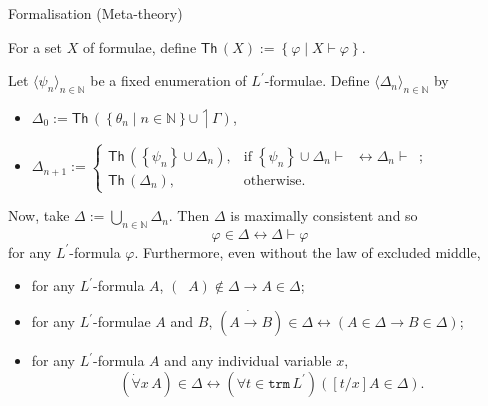 \documentclass[serif,table,10pt]{beamer}
\newcommand{\IN}{\mathbb{N}}
\newcommand{\0}{\texttt{0}}
\newcommand{\1}{\texttt{1}}
\newcommand{\embed}[1]{{\upharpoonleft} {#1}}
\newcommand{\Lbot}{\mathop{\dot{\bot}}}
\newcommand{\Lneg}{\mathop{\dot{\neg}}}
\newcommand{\Lto}{\mathrel{\dot{\to}}}
\newcommand{\Lall}[1]{\dot{\forall}#1\,}
\begin{document}
\begin{frame}{Formalisation (Meta-theory)}

    For a set $X$ of formulae, define $ \mathsf{Th} \, ( X ) := \left\{ \varphi \mid X \vdash \varphi \right\} $.

    Let $\langle\psi_n\rangle_{n \in \IN}$ be a fixed enumeration of $L^\prime$-formulae.
    Define $\langle \Delta_n \rangle_{n \in \IN}$ by
    \begin{itemize}
        \item $\Delta_0 := \mathsf{Th} \, (\left\{ \theta_n \mid n \in \IN \right\} \cup \embed{\Gamma})$,
        \item $\Delta_{n + 1} := \begin{cases} \mathsf{Th} \, ( \left\{ \psi_n \right\} \cup \Delta_n ) , & \mathrm{if} \; \left\{ \psi_n \right\} \cup \Delta_n \vdash \Lbot \leftrightarrow \Delta_n \vdash \Lbot ; \\ \mathsf{Th} \, ( \Delta_n ) , & \mathrm{otherwise} . \end{cases}$
    \end{itemize}
    Now, take $\Delta := \bigcup_{n\in\IN} \Delta_n$. 
    Then $\Delta$ is maximally consistent and so \[ \varphi \in \Delta \leftrightarrow \Delta \vdash \varphi \] for any $L^\prime$-formula $\varphi$.
    Furthermore, even without the law of excluded middle,
    \begin{itemize}
        \item for any $L^\prime$-formula $A $, $ ( \Lneg A ) \notin \Delta \to A \in \Delta $;
        \item for any $L^\prime$-formulae $A$ and $B$, $ ( A \Lto B ) \in \Delta \leftrightarrow ( A \in \Delta \to B \in \Delta ) $;
        \item for any $L^\prime$-formula $A$ and any individual variable $x$, \[ ( \Lall{x} A ) \in \Delta \leftrightarrow (\forall t \in \mathtt{trm} \, L^\prime) ( [t / x] A \in \Delta ) . \]
    \end{itemize}

\end{frame}
\end{document}
